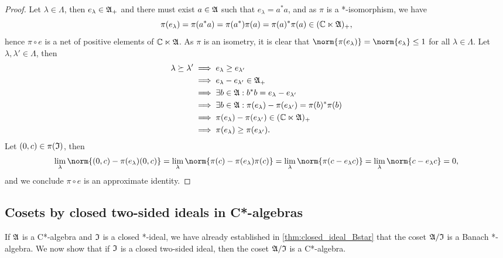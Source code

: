 \begin{proof}
    Let \(\lambda \in \Lambda\), then \(e_{\lambda} \in \mathfrak{A}_+\) and there must exist \(a \in \mathfrak{A}\) such that \(e_{\lambda} = a^*a\), and as \(\pi\) is a *-isomorphism, we have
    \begin{equation*}
        \pi(e_{\lambda}) = \pi(a^*a) = \pi(a^*) \pi(a) = \pi(a)^* \pi(a) \in (\mathbb{C} \ltimes \mathfrak{A})_+,
    \end{equation*}
    hence \(\pi \circ e\) is a net of positive elements of \(\mathbb{C} \ltimes \mathfrak{A}\). As \(\pi\) is an isometry, it is clear that \(\norm{\pi(e_{\lambda})} = \norm{e_{\lambda}} \leq 1\) for all \(\lambda \in \Lambda\). Let \(\lambda, \lambda' \in \Lambda\), then
    \begin{align*}
        \lambda \succeq \lambda' &\implies e_{\lambda} \geq e_{\lambda'}\\
                                 &\implies e_{\lambda} - e_{\lambda'} \in \mathfrak{A}_+\\
                                 &\implies \exists b \in \mathfrak{A} : b^*b = e_{\lambda} - e_{\lambda'}\\
                                 &\implies \exists b \in \mathfrak{A} : \pi(e_{\lambda}) - \pi(e_{\lambda'}) = \pi(b)^*\pi(b)\\
                                 &\implies \pi(e_{\lambda}) - \pi(e_{\lambda'}) \in (\mathbb{C}\ltimes \mathfrak{A})_+\\
                                 &\implies \pi(e_{\lambda}) \geq \pi(e_{\lambda'}).
    \end{align*}
    Let \((0,c) \in \pi(\mathfrak{I})\), then
    \begin{equation*}
        \lim_{\lambda}{\norm{(0,c) - \pi(e_{\lambda})(0,c)}} = \lim_{\lambda}{\norm{\pi(c) - \pi(e_{\lambda})\pi(c)}} = \lim_{\lambda}{\norm{\pi(c - e_{\lambda}c)}} = \lim_{\lambda}{\norm{c - e_{\lambda}c}} = 0,
    \end{equation*}
    and we conclude \(\pi \circ e\) is an approximate identity.
\end{proof}

\subsection{Cosets by closed two-sided ideals in C*-algebras}
If \(\mathfrak{A}\) is a C*-algebra and \(\mathfrak{I}\) is a closed *-ideal, we have already established in \cref{thm:closed_ideal_Bstar} that the coset \(\mathfrak{A} / \mathfrak{I}\) is a Banach *-algebra. We now show that if \(\mathfrak{I}\) is a closed two-sided ideal, then the coset \(\mathfrak{A}/\mathfrak{I}\) is a C*-algebra.

